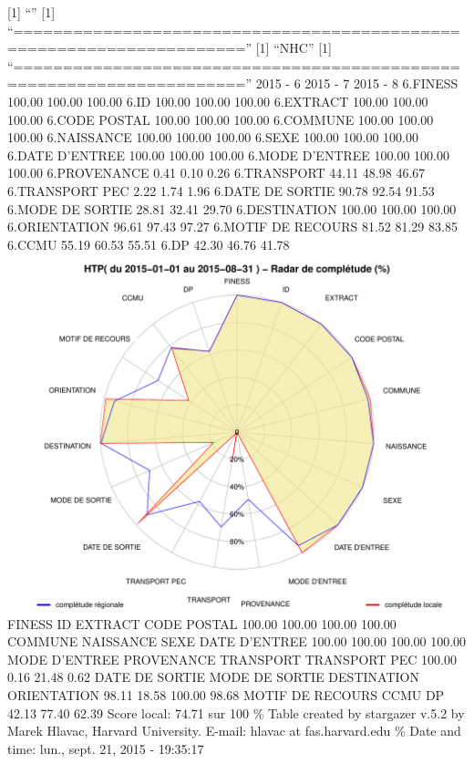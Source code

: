 \documentclass[]{article}
\begin{document}
{[}1{]} ``'' {[}1{]}
``=====================================================================''
{[}1{]} ``NHC'' {[}1{]}
``=====================================================================''
2015 - 6 2015 - 7 2015 - 8 6.FINESS 100.00 100.00 100.00 6.ID 100.00
100.00 100.00 6.EXTRACT 100.00 100.00 100.00 6.CODE POSTAL 100.00 100.00
100.00 6.COMMUNE 100.00 100.00 100.00 6.NAISSANCE 100.00 100.00 100.00
6.SEXE 100.00 100.00 100.00 6.DATE D'ENTREE 100.00 100.00 100.00 6.MODE
D'ENTREE 100.00 100.00 100.00 6.PROVENANCE 0.41 0.10 0.26 6.TRANSPORT
44.11 48.98 46.67 6.TRANSPORT PEC 2.22 1.74 1.96 6.DATE DE SORTIE 90.78
92.54 91.53 6.MODE DE SORTIE 28.81 32.41 29.70 6.DESTINATION 100.00
100.00 100.00 6.ORIENTATION 96.61 97.43 97.27 6.MOTIF DE RECOURS 81.52
81.29 83.85 6.CCMU 55.19 60.53 55.51 6.DP 42.30 46.76 41.78
\includegraphics{completude_files/figure-latex/finess-16.pdf} FINESS ID
EXTRACT CODE POSTAL 100.00 100.00 100.00 100.00 COMMUNE NAISSANCE SEXE
DATE D'ENTREE 100.00 100.00 100.00 100.00 MODE D'ENTREE PROVENANCE
TRANSPORT TRANSPORT PEC 100.00 0.16 21.48 0.62 DATE DE SORTIE MODE DE
SORTIE DESTINATION ORIENTATION 98.11 18.58 100.00 98.68 MOTIF DE RECOURS
CCMU DP 42.13 77.40 62.39 Score local: 74.71 sur 100 \% Table created by
stargazer v.5.2 by Marek Hlavac, Harvard University. E-mail: hlavac at
fas.harvard.edu \% Date and time: lun., sept. 21, 2015 - 19:35:17
\end{document}
